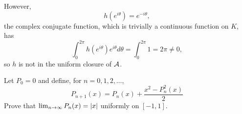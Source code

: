 \documentclass[a4paper, 12pt]{article}
\begin{document}
\begin{solution}
    However, \begin{equation*}
    h(e^{i\theta}) = e^{-i\theta},
    \end{equation*}
    the complex conjugate function, which is trivially a continuous function on $K$, has \begin{equation*}
        \int_{0}^{2\pi} h(e^{i\theta}) e^{i\theta} d\theta = \int_{0}^{2\pi} 1  = 2\pi \neq 0,
    \end{equation*}
    so $h$ is not in the uniform closure of $\mathcal{A}$.
\end{solution}

\begin{problem} 
Let $P_0 = 0$ and define, for $n = 0, 1, 2, \ldots$, \begin{equation*}
P_{n+1}(x) = P_n(x) + \frac{x^2 - P_n^2(x)}{2}
\end{equation*}
Prove that $\lim_{n \to \infty} P_n(x) = \lvert x\rvert$ uniformly on $[-1, 1]$.
\end{problem}
\end{document}
